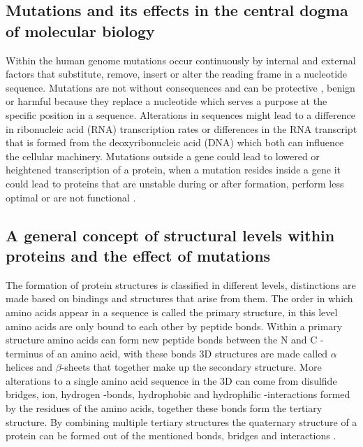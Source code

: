 \subsection{Mutations and its effects in the central dogma of molecular biology}
Within the human genome mutations occur continuously by internal and external factors that substitute, remove, insert or alter the reading frame in a nucleotide sequence. Mutations are not without consequences and can be protective \cite{harper_protective_2015}, benign or harmful because they replace a nucleotide which serves a purpose at the specific position in a sequence. Alterations in sequences might lead to a difference in ribonucleic acid (RNA) transcription rates or differences in the RNA transcript that is formed from the deoxyribonucleic acid (DNA) which both can influence the cellular machinery. Mutations outside a gene could lead to lowered or heightened transcription of a protein, when a mutation resides inside a gene it could lead to proteins that are unstable during or after formation, perform less optimal or are not functional \cite{nih_sickle_nodate,nih_cystic_nodate,nih_traps_2016}.

\subsection{A general concept of structural levels within proteins and the effect of mutations}
The formation of protein structures is classified in different levels, distinctions are made based on bindings and structures that arise from them. 
The order in which amino acids appear in a sequence is called the primary structure, in this level amino acids are only bound to each other by peptide bonds. 
Within a primary structure amino acids can form new peptide bonds between the N and C -terminus of an amino acid, with these bonds 3D structures are made called $\alpha$ helices and $\beta$-sheets that together make up the secondary structure.
More alterations to a single amino acid sequence in the 3D can come from disulfide bridges, ion, hydrogen -bonds, hydrophobic and hydrophilic -interactions formed by the residues of the amino acids, together these bonds form the tertiary structure.
By combining multiple tertiary structures the quaternary structure of a protein can be formed out of the mentioned bonds, bridges and interactions \cite{wikipedia_protein_2019, bennion_protein_2002}.

